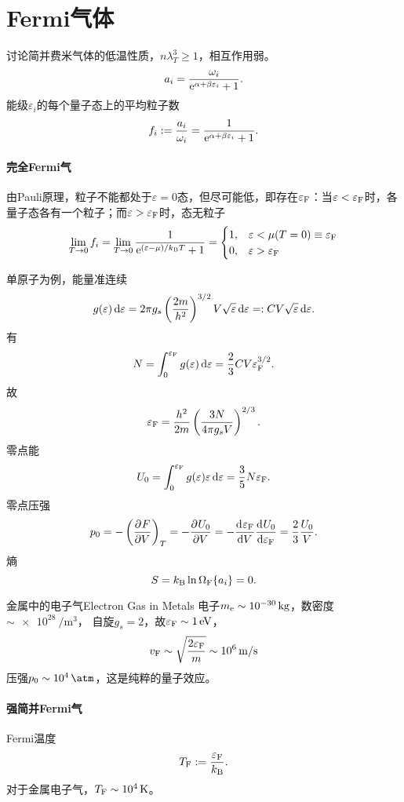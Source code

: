 \section{Fermi气体}
讨论简并费米气体的低温性质，$n\lambda_T^3\geqslant 1$，相互作用弱。
\[
	a_i=\frac{\omega_i}{\e{\alpha+\beta\varepsilon_i}+1}.
\]
能级$\varepsilon_i$的每个量子态上的平均粒子数
\[
	f_i:=\frac{a_i}{\omega_i}=\frac1{\e{\alpha+\beta\varepsilon_i}+1}.
\]
\paragraph{完全Fermi气}由Pauli原理，粒子不能都处于$\varepsilon=0$态，但尽可能低，即存在$\varepsilon_\Fm$：当$\varepsilon<\varepsilon_\Fm$时，各量子态各有一个粒子；而$\varepsilon>\varepsilon_\Fm$时，态无粒子
\[
	\lim_{T\to0}f_i=\lim_{T\to0}\frac1{\e{(\varepsilon-\mu)/\kB T}+1}=\begin{cases}
	1,&\varepsilon<\mu(T=0)\equiv\varepsilon_\Fm\\0,&\varepsilon>\varepsilon_\Fm
\end{cases}
\]

单原子为例，能量准连续
\[
	g(\varepsilon)\d\varepsilon=2\pi g_s\kh{\frac{2m}{h^2}}^{3/2}V\sqrt\varepsilon\d\varepsilon=:CV\sqrt\varepsilon\d\varepsilon.
\]
有
\[
	N=\int_0^{\varepsilon_\Fm}g(\varepsilon)\d\varepsilon=\frac23CV\varepsilon_\Fm^{3/2}.
\]
故
\begin{align}
	\varepsilon_\Fm=\frac{h^2}{2m}\kh{\frac{3N}{4\pi g_sV}}^{2/3}.
\end{align}
零点能
\begin{align}
	U_0=\int_0^{\varepsilon_\Fm}g(\varepsilon)\varepsilon\d\varepsilon=\frac35N\varepsilon_\Fm.
\end{align}
零点压强
\[
	p_0=-\kh{\pv FV}_T=-\pv{U_0}V=-\dv{\varepsilon_\Fm}V\dv{U_0}{\varepsilon_\Fm}=\frac23\frac{U_0}V.
\]
熵
\[
	S=\kB\ln\Om[F]=0.
\]
\begin{example}{金属中的电子气}{Electron Gas in Metals}
	电子$m_\elc\sim\SI{e-30}\kg$，数密度$\sim\SI{e28}{\per\m\cubed}$， %
	自旋$g_s=2$，故$\varepsilon_\Fm\sim\SI1\eV$，
	\[
	v_\Fm\sim\sqrt{\frac{2\varepsilon_\Fm}m}\sim\SI[per-mode=symbol]{e6}{\m\per\s}
\]
	压强$p_0\sim\SI{e4}\atm$，这是纯粹的量子效应。
\end{example}
\paragraph{强简并Fermi气}Fermi温度
\[
	T_\Fm:=\frac{\varepsilon_\Fm}\kB.
\]
对于金属电子气，$T_\Fm\sim\SI{e4}\K$。

